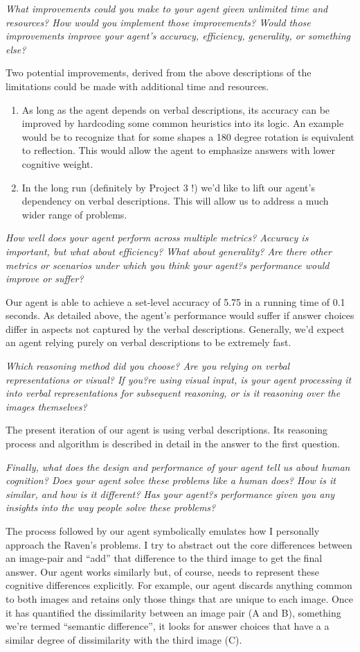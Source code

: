 \documentclass[10pt,letterpaper]{article}
\newcommand{\mypar}{\par{\vspace{0.2cm}}}
\newcommand{\rubric}[1]{\mypar{}\textcolor{mygray}{\emph{#1}}\mypar{}}
\begin{document}
\rubric{What improvements could you make to your agent given unlimited time and resources? How would you implement those improvements? Would those improvements improve your agent's accuracy, efficiency, generality, or something else?}
Two potential improvements, derived from the above descriptions of the limitations could be made with additional time and resources.
\begin{enumerate}
\item As long as the agent depends on verbal descriptions, its accuracy can be improved by hardcoding some common heuristics into its logic. An example would be to recognize that for some shapes a 180 degree rotation is equivalent to reflection. This would allow the agent to emphasize answers with lower cognitive weight. 

\item In the long run (definitely by Project 3 !) we'd like to lift our agent's dependency on verbal descriptions. This will allow us to address a much wider range of problems.
\end{enumerate}
\rubric{How well does your agent perform across multiple metrics? Accuracy is important, but what about efficiency? What about generality? Are there other metrics or scenarios under which you think your agent?s performance would improve or suffer?}
Our agent is able to achieve a set-level accuracy of 5.75 in a running time of 0.1 seconds. As detailed above, the agent's performance would suffer if answer choices differ in aspects not captured by the verbal descriptions. Generally, we'd expect an agent relying purely on verbal descriptions to be extremely fast.
\rubric{Which reasoning method did you choose? Are you relying on verbal representations or visual? If you?re using visual input, is your agent processing it into verbal representations for subsequent reasoning, or is it reasoning over the images themselves?}
The present iteration of our agent is using verbal descriptions. Its reasoning process and algorithm is described in detail in the answer to the first question. 
\rubric{Finally, what does the design and performance of your agent tell us about human cognition? Does your agent solve these problems like a human does? How is it similar, and how is it different? Has your agent?s performance given you any insights into the way people solve these problems?}

The process followed by our agent symbolically emulates how I personally approach the Raven's problems. I try to abstract out the core differences between an image-pair and ``add'' that difference to the third image to get the final answer. Our agent works similarly but, of course, needs to represent these cognitive differences explicitly. For example, our agent discards anything common to both images and retains only those things that are unique to each image. Once it has quantified the dissimilarity between an image pair (A and B), something we're termed ``semantic difference'', it looks for answer choices that have a a similar degree of dissimilarity with the third image (C). 
\end{document}
